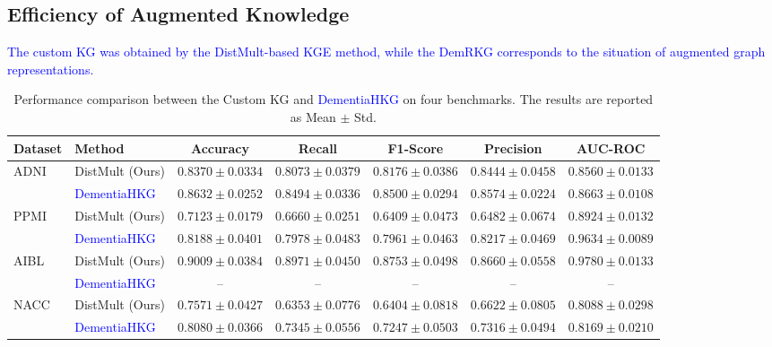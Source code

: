 \documentclass[lettersize,journal]{IEEEtran}
\begin{document}
\subsection{Efficiency of Augmented Knowledge}

    \textcolor{blue}{The custom KG was obtained by the DistMult-based KGE method, while the DemRKG corresponds to the situation of augmented graph representations.}


    \begin{table}[t]
        \centering
        \caption{Performance comparison between the Custom KG and \textcolor{blue}{DementiaHKG} on four benchmarks. The results are reported as Mean $\pm$ Std.}
        \label{tab:\textcolor{blue}{DementiaHKG}_comparison}
        \begin{tabular}{llccccc}
            \toprule
            Dataset & Method & Accuracy & Recall & F1-Score & Precision & AUC-ROC \\
            \midrule
            \multirow{2}{*}{ADNI}
                & DistMult (Ours) & $0.8370 \pm 0.0334$ & $0.8073 \pm 0.0379$ & $0.8176 \pm 0.0386$ & $0.8444 \pm 0.0458$ & $0.8560 \pm 0.0133$ \\
                & \textcolor{blue}{DementiaHKG} & $\mathbf{0.8632 \pm 0.0252}$ & $\mathbf{0.8494 \pm 0.0336}$ & $\mathbf{0.8500 \pm 0.0294}$ & $\mathbf{0.8574 \pm 0.0224}$ & $\mathbf{0.8663 \pm 0.0108}$ \\
            \midrule
            \multirow{2}{*}{PPMI}
                & DistMult (Ours) & $0.7123 \pm 0.0179$ & $0.6660 \pm 0.0251$ & $0.6409 \pm 0.0473$ & $0.6482 \pm 0.0674$ & $0.8924 \pm 0.0132$ \\
                & \textcolor{blue}{DementiaHKG} & $\mathbf{0.8188 \pm 0.0401}$ & $\mathbf{0.7978 \pm 0.0483}$ & $\mathbf{0.7961 \pm 0.0463}$ & $\mathbf{0.8217 \pm 0.0469}$ & $\mathbf{0.9634 \pm 0.0089}$ \\
            \midrule
            \multirow{2}{*}{AIBL}
                & DistMult (Ours) & $0.9009 \pm 0.0384$ & $0.8971 \pm 0.0450$ & $0.8753 \pm 0.0498$ & $0.8660 \pm 0.0558$ & $0.9780 \pm 0.0133$ \\
                & \textcolor{blue}{DementiaHKG} & -- & -- & -- & -- & -- \\
            \midrule
            \multirow{2}{*}{NACC}
                & DistMult (Ours) & $0.7571 \pm 0.0427$ & $0.6353 \pm 0.0776$ & $0.6404 \pm 0.0818$ & $0.6622 \pm 0.0805$ & $0.8088 \pm 0.0298$ \\
                & \textcolor{blue}{DementiaHKG} & $\mathbf{0.8080 \pm 0.0366}$ & $\mathbf{0.7345 \pm 0.0556}$ & $\mathbf{0.7247 \pm 0.0503}$ & $\mathbf{0.7316 \pm 0.0494}$ & $\mathbf{0.8169 \pm 0.0210}$ \\
            \bottomrule
        \end{tabular}
    \end{table}
\end{document}

